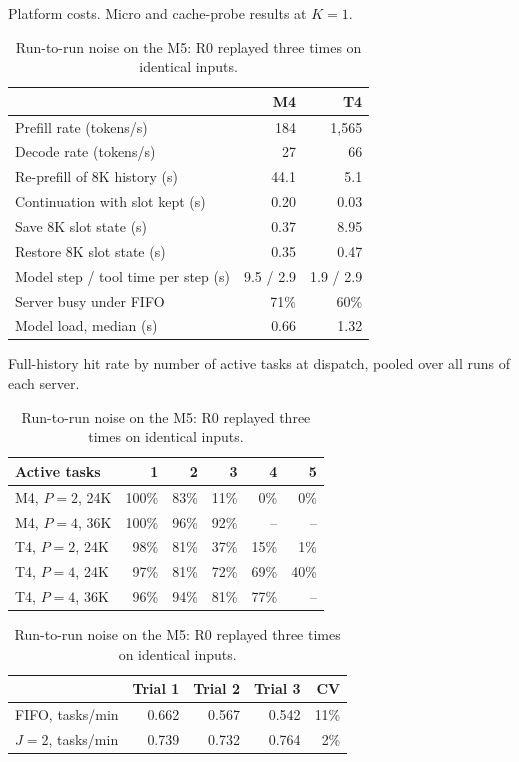 \documentclass[9pt,twocolumn]{extarticle}
\begin{document}
\begin{table}[h]
\centering
\footnotesize
\setlength{\tabcolsep}{5pt}
\begin{minipage}[t]{0.48\textwidth}
\centering
\caption{Platform costs. Micro and cache-probe results at $K=1$.}
\begin{tabular}{@{}lrr@{}}
\toprule
& M4 & T4 \\
\midrule
Prefill rate (tokens/s) & 184 & 1,565 \\
Decode rate (tokens/s) & 27 & 66 \\
Re-prefill of 8K history (s) & 44.1 & 5.1 \\
Continuation with slot kept (s) & 0.20 & 0.03 \\
Save 8K slot state (s) & 0.37 & 8.95 \\
Restore 8K slot state (s) & 0.35 & 0.47 \\
Model step / tool time per step (s) & 9.5 / 2.9 & 1.9 / 2.9 \\
Server busy under FIFO & 71\% & 60\% \\
Model load, median (s) & 0.66 & 1.32 \\
\bottomrule
\end{tabular}
\end{minipage}\hfill
\begin{minipage}[t]{0.48\textwidth}
\centering
\caption{Full-history hit rate by number of active tasks at dispatch, pooled over all runs of each server.}
\begin{tabular}{@{}lrrrrr@{}}
\toprule
Active tasks & 1 & 2 & 3 & 4 & 5 \\
\midrule
M4, $P=2$, 24K & 100\% & 83\% & 11\% & 0\% & 0\% \\
M4, $P=4$, 36K & 100\% & 96\% & 92\% & -- & -- \\
T4, $P=2$, 24K & 98\% & 81\% & 37\% & 15\% & 1\% \\
T4, $P=4$, 24K & 97\% & 81\% & 72\% & 69\% & 40\% \\
T4, $P=4$, 36K & 96\% & 94\% & 81\% & 77\% & -- \\
\bottomrule
\end{tabular}

\vspace{0.8em}
\caption{Run-to-run noise on the M5: R0 replayed three times on identical inputs.}
\begin{tabular}{@{}lrrrr@{}}
\toprule
& Trial 1 & Trial 2 & Trial 3 & CV \\
\midrule
FIFO, tasks/min & 0.662 & 0.567 & 0.542 & 11\% \\
$J=2$, tasks/min & 0.739 & 0.732 & 0.764 & 2\% \\
\bottomrule
\end{tabular}
\end{minipage}
\end{table}
\end{document}
